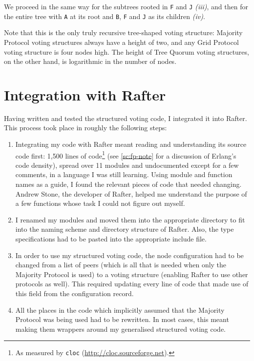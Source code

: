 \documentclass[12pt,chapterprefix=true,toc=bibliography,numbers=noendperiod,
               footnotes=multiple,twoside]{scrreprt}
\begin{document}
We proceed in the same way for the subtrees rooted in \texttt{F} and \texttt{J} \emph{(iii)}, and then for the entire tree with \texttt{A} at its root and \texttt{B}, \texttt{F} and \texttt{J} as its children \emph{(iv)}.

Note that this is the only truly recursive tree-shaped voting structure: Majority Protocol voting structures always have a height of two, and any Grid Protocol voting structure is four nodes high. The height of Tree Quorum voting structures, on the other hand, is logarithmic in the number of nodes.

\section{Integration with Rafter}
\label{sc:rafter-integration}

Having written and tested the structured voting code, I integrated it into Rafter. This process took place in roughly the following steps:

\begin{enumerate}
    \item Integrating my code with Rafter meant reading and understanding its source code first: 1,500 lines of code\footnote{As measured by \texttt{cloc} (\url{http://cloc.sourceforge.net}).} (see \cref{sc:fp-note} for a discussion of Erlang's code density), spread over 11 modules and undocumented except for a few comments, in a language I was still learning. Using module and function names as a guide, I found the relevant pieces of code that needed changing. Andrew Stone, the developer of Rafter, helped me understand the purpose of a few functions whose task I could not figure out myself.
    \item I renamed my modules and moved them into the appropriate directory to fit into the naming scheme and directory structure of Rafter. Also, the type specifications had to be pasted into the appropriate include file.
    \item In order to use my structured voting code, the node configuration had to be changed from a list of peers (which is all that is needed when only the Majority Protocol is used) to a voting structure (enabling Rafter to use other protocols as well). This required updating every line of code that made use of this field from the configuration record.
    \item All the places in the code which implicitly assumed that the Majority Protocol was being used had to be rewritten. In most cases, this meant making them wrappers around my generalised structured voting code.
\end{enumerate}
\end{document}
